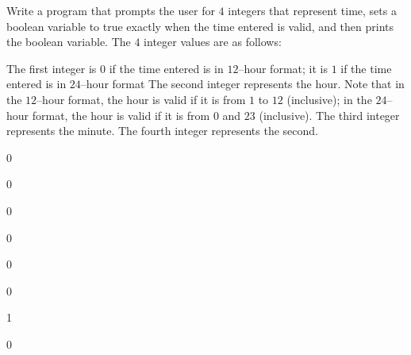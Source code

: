 Write a program that prompts the user for $4$ integers that represent time,
sets a boolean variable to true exactly when the time entered is valid, and
then prints the boolean variable. The $4$ integer values are as follows:
\begin{itemize}
  \li The first integer is $0$ if the time entered is in $12$--hour format; it
      is $1$ if the time entered is in $24$--hour format
  \li The second integer represents the hour. Note that in the $12$--hour
      format, the hour is valid if it is 
      from $1$ to  $12$ (inclusive); 
      in the
      $24$--hour format, the hour is valid if it is 
      from $0$ and $23$ (inclusive).
  \li The third integer represents the minute. 
  \li The fourth integer represents the second.
\end{itemize}

\resett
\nextt
\begin{console}[commandchars=\\\{\}]
0
\end{console}

\nextt
\begin{console}[commandchars=\\\{\}]
0
\end{console}

\nextt
\begin{console}[commandchars=\\\{\}]
0
\end{console}

\nextt
\begin{console}[commandchars=\\\{\}]
0
\end{console}

\nextt
\begin{console}[commandchars=\\\{\}]
0
\end{console}

\nextt
\begin{console}[commandchars=\\\{\}]
0
\end{console}

\nextt
\begin{console}[commandchars=\\\{\}]
1
\end{console}

\nextt
\begin{console}[commandchars=\\\{\}]
0
\end{console}

